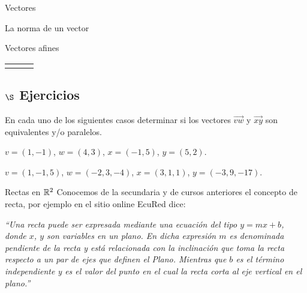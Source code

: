\begin{chapter}{Vectores}
\begin{section}{La norma de un vector}
\begin{section}{Vectores afines}
\begin{center}
\begin{tabular}{lcl}
\begin{tikzpicture}[scale=0.8]
                \end{tikzpicture}
            \end{tabular}
        \end{center}

        
    \subsection*{$\S$ Ejercicios}
    
    \begin{enumex}

        \item En  cada uno de los siguientes casos determinar si los
        vectores  $\overrightarrow{vw}$ y $\overrightarrow{xy}$ son
        equivalentes y/o paralelos.
        \begin{enumex}
        \item   $v=(1,-1)$,  $w=(4,3)$, $x=(-1,5)$, $y=(5,2)$. 
        \item   $v=(1,-1,5)$,  $w=(-2,3,-4)$,  $x=(3,1,1)$,  $y=(-3,9,-17)$.
        \end{enumex}
    \end{enumex}

    \end{section}


    \end{section}

    \begin{section}{Rectas en $\mathbb R^2$}\label{seccion-rectas-en-r2}
    Conocemos de la secundaria y de cursos anteriores el concepto de recta, por ejemplo en el  sitio online EcuRed dice: 
    
    \textit{``Una recta puede ser expresada mediante una ecuación del tipo $y = m x + b$, donde $x$, $y$ son variables en un plano. En dicha expresión $m$ es denominada pendiente de la recta y está relacionada con la inclinación que toma la recta respecto a un par de ejes que definen el Plano. Mientras que $b$ es el término independiente y es el valor del punto en el cual la recta corta al eje vertical en el plano.''}
    

\end{section}
\end{chapter}
